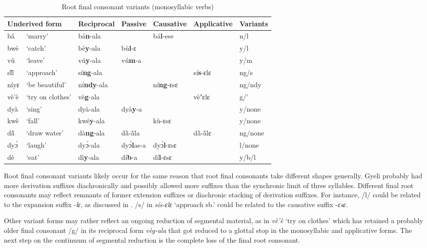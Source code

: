 \begin{table} 
\centering
\small
\begin{tabular}{ll|llll|l}
\multicolumn{2}{l|}{Underived form}  & Reciprocal         & Passive & Causative & Applicative & Variants \\
 \midrule
bâ 			 & `marry' &  bá{\bfseries n}-ala & 	       & bá{\bfseries l}-ese	& 		& n/l \\		
bwè 			& `catch' &  bè{\bfseries y}-ala & bù{\bfseries l}-ɛ & 		& 		& 		y/l \\
vû 			&  `leave' &  vú{\bfseries y}-ala &  vú{\bfseries m}-a & 	&  		& 	y/m \\
sĩ́ĩ̀ 			& `approach' & sí{\bfseries ng}-ala & 		& 		&  sí{\bfseries s}-ɛlɛ & ng/s \\
níyɛ			& `be beautiful' & ní{\bfseries ndy}-ala  & 		& ní{\bfseries ng}-ɛsɛ	& 		& ng/ndy  \\
vè'è 			& `try on clothes' &  vè{\bfseries g}-ala & 	& 		&  vè{\bfseries '}ɛlɛ  & 	g/'  \\
dyà			& `sing'    & dyà-ala		& dyà{\bfseries y}-a & 	& 		& 		y/none \\
kwê 			& `fall' 	&  kwé{\bfseries y}-ala & 		&  kù-ɛsɛ  & 		& 	y/none \\
dã̂ 			& `draw water' &  dà{\bfseries ng}-ala &  dã̀-ã̀la & 	&  dã̀-ã̀lɛ	& 	ng/none \\
dyɔ̀			& `laugh'		& dyɔ̀-ala		& dyɔ̀{\bfseries l}as-a & dyɔ̀{\bfseries l}-ɛsɛ &  & l/none \\ 
dè 			& `eat' 	& dì{\bfseries y}-ala & dí{\bfseries b}-a &  dí{\bfseries l}-ɛsɛ & 	& 	y/b/l \\
 \midrule
\end{tabular}
\caption{Root final consonant variants (monosyllabic verbs)}
\label{Tab:RFCVmono}
\end{table} 

Root final consonant variants likely occur for the same reason that root final consonants take different shapes generally. Gyeli probably had more derivation suffixes diachronically and possibly allowed more suffixes than the synchronic limit of three syllables. Different final root consonants may reflect remnants of former extension suffixes or diachronic stacking of derivation suffixes. For instance, /l/ could be related to the expansion suffix -{\itshape lɛ}, as discussed in . /s/ in {\itshape sís-ɛlɛ} `approach sb.' could be related to the causative suffix -{\itshape ɛsɛ}. 

Other variant forms may rather reflect an ongoing reduction of segmental material, as in {\itshape vè'è} `try on clothes' which has retained a probably older final consonant /g/ in its reciprocal form {\itshape vèg-ala} that got reduced to a glottal stop in the monosyllabic and applicative forms. The next step on the continuum of segmental reduction is the complete loss of the final root consonant.

